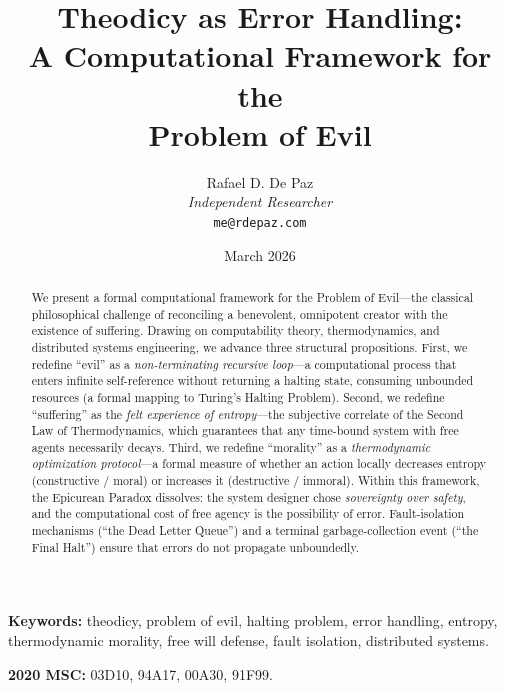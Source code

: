 \documentclass[12pt, a4paper]{article}
\theoremstyle{plain}
\theoremstyle{definition}
\theoremstyle{remark}
\begin{document}
\title{
  \textbf{Theodicy as Error Handling: \\
  A Computational Framework for the \\
  Problem of Evil}
}
\author{
  Rafael D. De Paz \\
  \textit{Independent Researcher} \\
  \texttt{me@rdepaz.com}
}
\date{March 2026}
\maketitle

\begin{abstract}
We present a formal computational framework for the Problem of Evil---the
classical philosophical challenge of reconciling a benevolent, omnipotent
creator with the existence of suffering. Drawing on computability theory,
thermodynamics, and distributed systems engineering, we advance three
structural propositions. First, we redefine ``evil'' as a \emph{non-terminating
recursive loop}---a computational process that enters infinite self-reference
without returning a halting state, consuming unbounded resources (a formal
mapping to Turing's Halting Problem). Second, we redefine ``suffering'' as the
\emph{felt experience of entropy}---the subjective correlate of the Second
Law of Thermodynamics, which guarantees that any time-bound system with free
agents necessarily decays. Third, we redefine ``morality'' as a
\emph{thermodynamic optimization protocol}---a formal measure of whether an
action locally decreases entropy (constructive / moral) or increases it
(destructive / immoral). Within this framework, the Epicurean Paradox
dissolves: the system designer chose \emph{sovereignty over safety}, and
the computational cost of free agency is the possibility of error.
Fault-isolation mechanisms (``the Dead Letter Queue'') and a terminal
garbage-collection event (``the Final Halt'') ensure that errors do not
propagate unboundedly.
\end{abstract}

\vspace{1em}
\noindent\textbf{Keywords:} theodicy, problem of evil, halting problem,
error handling, entropy, thermodynamic morality, free will defense,
fault isolation, distributed systems.

\vspace{0.5em}
\noindent\textbf{2020 MSC:} 03D10, 94A17, 00A30, 91F99.
\end{document}
